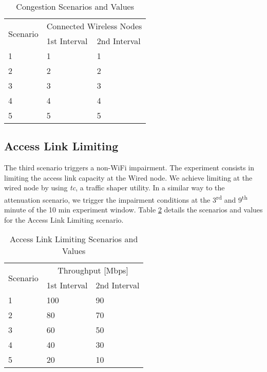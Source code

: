 \begin{table}[h!]
	\begin{center}
		\begin{tabular}{|| m{5em} | m{2cm}| m{2cm} ||}
			\hline
			\multirow{2}{*}{Scenario} & \multicolumn{2}{l||}{Connected Wireless Nodes} \\ \cline{2-3} 
			& \multicolumn{1}{l|}{1st Interval} & \multicolumn{1}{l||}{2nd Interval} \\ \hline\hline
			1 & 1 & 1 \\ \hline
			2 & 2 & 2 \\ \hline
			3 & 3 & 3 \\ \hline
			4 & 4 & 4 \\ \hline
			5 & 5 & 5 \\ \hline
		\end{tabular}
	\end{center}
	\caption{Congestion Scenarios and Values}
	\label{table:Congestion_Experiment_Values}
\end{table}

\subsection*{Access Link Limiting}\label{access_link}

The third scenario triggers a non-WiFi impairment. The experiment consists in limiting the access link capacity at the Wired node. We achieve limiting at the wired node by using \emph{tc}, a traffic shaper utility. In a similar way to the attenuation scenario, we trigger the impairment conditions at the 3\textsuperscript{rd} and 9\textsuperscript{th} minute of the 10 min experiment window. Table \ref{table:Access_Link_Experiment_Values} details the scenarios and values for the Access Link Limiting scenario.

\begin{table}[h!]
	\begin{center}
		\begin{tabular}{|| m{5em} | m{2cm}| m{2cm} ||}
			\hline
			\multirow{2}{*}{Scenario} & \multicolumn{2}{c||}{Throughput {[}Mbps{]}} \\ \cline{2-3} 
			& \multicolumn{1}{l|}{1st Interval} & \multicolumn{1}{l||}{2nd Interval} \\ \hline\hline
			1 & 100 & 90 \\ \hline
			2 & 80 & 70 \\ \hline
			3 & 60 & 50 \\ \hline
			4 & 40 & 30 \\ \hline
			5 & 20 & 10 \\ \hline
		\end{tabular}
	\end{center}
	\caption{Access Link Limiting Scenarios and Values}
	\label{table:Access_Link_Experiment_Values}
\end{table}

